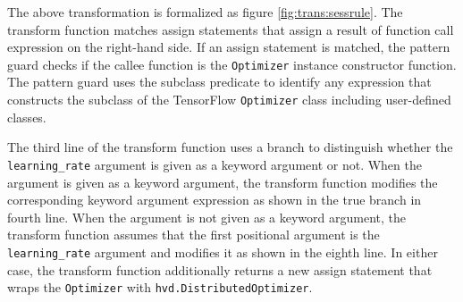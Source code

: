 The above transformation is formalized as figure 
\ref{fig:trans:sessrule}. The transform function 
matches assign statements that assign a result of function call expression
on the right-hand side.
If an assign statement is matched, the pattern guard checks if the
callee function is the {\tt Optimizer} instance constructor function.
The pattern guard uses the subclass predicate \ktsubtysubs{\smodenv}
to identify any expression that constructs the subclass of the TensorFlow
{\tt Optimizer} class including user-defined classes.

The third line of the transform function uses a branch to distinguish 
whether the {\tt learning\_rate} argument is given as a keyword argument or not. 
When the argument is given as a keyword argument,
the transform function modifies the corresponding keyword argument expression
as shown in the true branch in fourth line.
When the argument is not given as a keyword argument,
the transform function assumes that the first positional argument
is the {\tt learning\_rate} argument and modifies it
as shown in the eighth line.
In either case, the transform function additionally returns a new
assign statement that wraps the {\tt Optimizer} with
{\tt hvd.DistributedOptimizer}.

\pagebreak

